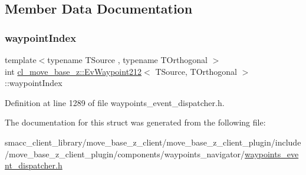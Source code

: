 \subsection{Member Data Documentation}
\mbox{\label{structcl__move__base__z_1_1EvWaypoint212_a9ff84061a9098659fdf0d3fbf0f3859c}} 
\subsubsection{\texorpdfstring{waypoint\+Index}{waypointIndex}}
{\footnotesize\ttfamily template$<$typename T\+Source , typename T\+Orthogonal $>$ \\
int \hyperlink{structcl__move__base__z_1_1EvWaypoint212}{cl\+\_\+move\+\_\+base\+\_\+z\+::\+Ev\+Waypoint212}$<$ T\+Source, T\+Orthogonal $>$\+::waypoint\+Index}



Definition at line 1289 of file waypoints\+\_\+event\+\_\+dispatcher.\+h.



The documentation for this struct was generated from the following file\+:\begin{DoxyCompactItemize}
\item 
smacc\+\_\+client\+\_\+library/move\+\_\+base\+\_\+z\+\_\+client/move\+\_\+base\+\_\+z\+\_\+client\+\_\+plugin/include/move\+\_\+base\+\_\+z\+\_\+client\+\_\+plugin/components/waypoints\+\_\+navigator/\hyperlink{waypoints__event__dispatcher_8h}{waypoints\+\_\+event\+\_\+dispatcher.\+h}\end{DoxyCompactItemize}
